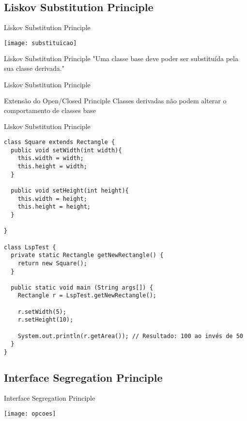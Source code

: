 \documentclass{beamer}
\begin{document}
\subsection{Liskov Substitution Principle}

\begin{frame}{Liskov Substitution Principle}
  \begin{center}
    \texttt{[image: substituicao]}
  \end{center}
\end{frame}

\begin{frame}{Liskov Substitution Principle}
 "Uma classe base deve poder ser substituída pela sua classe derivada."
\end{frame}

\begin{frame}{Liskov Substitution Principle}
 \begin{outline}
   Extensão do Open/Closed Principle
   Classes derivadas não podem alterar o comportamento de classes base
 \end{outline}
\end{frame}

\begin{frame}[fragile]{Liskov Substitution Principle}
 \begin{verbatim}
class Square extends Rectangle {
  public void setWidth(int width){
    this.width = width;
    this.height = width;
  }

  public void setHeight(int height){
    this.width = height;
    this.height = height;
  }

}

class LspTest {
  private static Rectangle getNewRectangle() {
    return new Square();
  }

  public static void main (String args[]) {
    Rectangle r = LspTest.getNewRectangle();
        
    r.setWidth(5);
    r.setHeight(10);
    
    System.out.println(r.getArea()); // Resultado: 100 ao invés de 50
  }
}
  \end{verbatim}
\end{frame}

\subsection{Interface Segregation Principle}

\begin{frame}{Interface Segregation Principle}
  \begin{center}
    \texttt{[image: opcoes]}
  \end{center}
\end{frame}
\end{document}
